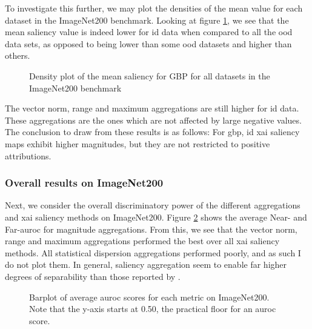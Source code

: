 \documentclass[UKenglish]{uiomasterthesis} %
\theoremstyle{definition}
\begin{document}
To investigate this further, we may plot the densities of the mean value for each dataset in the ImageNet200 benchmark. Looking at figure \ref{fig:imagenet200_gbp_mean_full}, we see that the mean saliency value is indeed lower for \ac{id} data when compared to all the \ac{ood} data sets, as opposed to being lower than some \ac{ood} datasets and higher than others.

\begin{figure}[hbtp]
    \begin{center}
        
    \end{center}
    \caption[Density plot of mean saliency for GBP on ImageNet200]{Density plot of the mean saliency for GBP for all datasets in the ImageNet200 benchmark}
    \label{fig:imagenet200_gbp_mean_full}
\end{figure}

The vector norm, range and maximum aggregations are still higher for \ac{id} data. These aggregations are the ones which are not affected by large negative values. The conclusion to draw from these results is as follows: For \ac{gbp}, \ac{id} \ac{xai} saliency maps exhibit higher magnitudes, but they are not restricted to positive attributions.

\subsubsection{Overall results on ImageNet200}

Next, we consider the overall discriminatory power of the different aggregations and \ac{xai} saliency methods on ImageNet200. Figure \ref{fig:imagenet200_all_metrics_barplot} shows the average Near- and Far-\ac{auroc} for magnitude aggregations. From this, we see that the vector norm, range and maximum aggregations performed the best over all \ac{xai} saliency methods. All statistical dispersion aggregations performed poorly, and as such I do not plot them. In general, saliency aggregation seem to enable far higher degrees of separability than those reported by \cite{martinez}.

\begin{figure}[hbtp]
    \begin{center}
        
    \end{center}
    \caption[Average AUROC scores for magnitude aggregations on ImageNet200]{Barplot of average \ac{auroc} scores for each metric on ImageNet200. Note that the y-axis starts at 0.50, the practical floor for an \ac{auroc} score.}
    \label{fig:imagenet200_all_metrics_barplot}
\end{figure}
\end{document}
